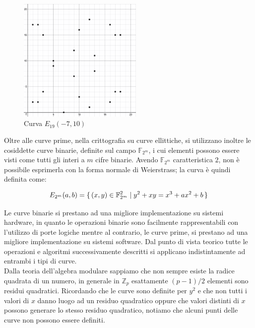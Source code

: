 \documentclass{article}
\begin{document}
	\begin{figure}[H]
		\centering
		
		\includegraphics[width=6cm, height=6cm]{img/img6}
		
		\caption{Curva $E_{19}(-7,10)$}
		\label{fig:fig6}
	\end{figure}%
	
	Oltre alle curve prime, nella crittografia su curve ellittiche, si utilizzano inoltre le cosiddette
	curve binarie, definite sul campo $\mathbb{F}_{2^{m}}$, i cui elementi possono essere visti
	come tutti gli interi a $m$ cifre binarie.
	Avendo $\mathbb{F}_{2^{m}}$ caratteristica $2$,
	non è possibile esprimerla con la forma normale di Weierstrass; la curva è quindi definita come:
	
	\begin{equation}
	E_{2^{m}}(a,b) = \set{ (x,y) \in \mathbb{F}_{2^{m}}^{2} | y^{2} + xy = x^{3} + ax^{2} + b }
	\end{equation}
	
	Le curve binarie si prestano ad una migliore implementazione su sistemi hardware, 
	in quanto le operazioni binarie sono facilmente rappresentabili con l'utilizzo di porte logiche
	mentre al contrario, le curve prime, si prestano ad una migliore implementazione su sistemi software.
	Dal punto di vista teorico tutte le operazioni e algoritmi successivamente descritti si applicano 
	indistintamente ad entrambi i tipi di curve.\\
	
	Dalla teoria dell'algebra modulare sappiamo che non sempre esiste la radice quadrata di un numero,
	in generale in $\mathbb{Z}_{p}$ esattamente $(p-1)/2$ elementi sono residui quadratici.
	Ricordando che le curve sono definite per $y^{2}$ e che non tutti i valori di $x$ danno luogo
	ad un residuo quadratico oppure che valori distinti di $x$ possono generare lo stesso residuo quadratico,
	notiamo che alcuni punti delle curve non possono essere definiti.\\
	
\end{document}
